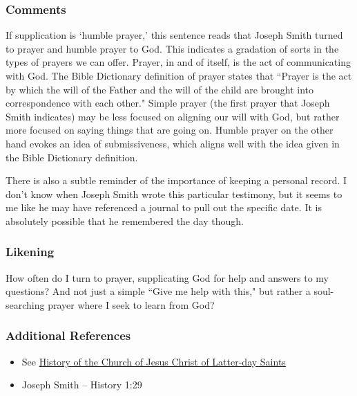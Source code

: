 \documentclass[12pt]{report}
\begin{document}
\subsubsection{Comments\label{js:comments2}}
If supplication is `humble prayer,' this sentence reads that Joseph Smith turned to prayer and humble prayer to God.  This indicates a gradation of sorts in the types of prayers we can offer.  Prayer, in and of itself, is the act of communicating with God.  The Bible Dictionary definition of prayer states that ``Prayer is the act by which the will of the Father and the will of the child are brought into correspondence with each other." Simple prayer (the first prayer that Joseph Smith indicates) may be less focused on aligning our will with God, but rather more focused on saying things that are going on.  Humble prayer on the other hand evokes an idea of submissiveness, which aligns well with the idea given in the Bible Dictionary definition.

There is also a subtle reminder of the importance of keeping a personal record.  I don't know when Joseph Smith wrote this particular testimony, but it seems to me like he may have referenced a journal to pull out the specific date.  It is absolutely possible that he remembered the day though.

\subsubsection{Likening\label{js:likening2}}
How often do I turn to prayer, supplicating God for help and answers to my questions?  And not just a simple ``Give me help with this," but rather a soul-searching prayer where I seek to learn from God?

\subsubsection{Additional References\label{js:references2}}
\begin{itemize}
\item See \href{https://byustudies.byu.edu/history-of-the-church}{History of the Church of Jesus Christ of Latter-day Saints}
\item Joseph Smith -- History 1:29
\end{itemize}

\end{document}
